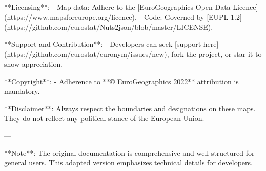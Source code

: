**Licensing**:
- Map data: Adhere to the [EuroGeographics Open Data Licence](https://www.mapsforeurope.org/licence).
- Code: Governed by [EUPL 1.2](https://github.com/eurostat/Nuts2json/blob/master/LICENSE).

**Support and Contribution**:
- Developers can seek [support here](https://github.com/eurostat/euronym/issues/new), fork the project, or star it to show appreciation.

**Copyright**:
- Adherence to **© EuroGeographics 2022** attribution is mandatory.

**Disclaimer**: Always respect the boundaries and designations on these maps. They do not reflect any political stance of the European Union.

---

**Note**: The original documentation is comprehensive and well-structured for general users. This adapted version emphasizes technical details for developers.